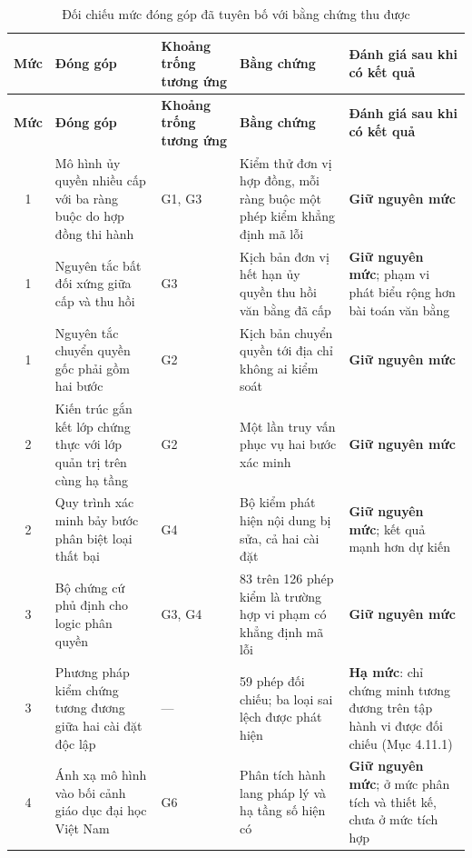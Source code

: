 \begin{longtable}{|c|p{4.0cm}|p{2.4cm}|p{2.5cm}|p{3.0cm}|}
\caption{Đối chiếu mức đóng góp đã tuyên bố với bằng chứng thu được}
\label{tab:contribution-levels} \\

\hline
\textbf{Mức} & \textbf{Đóng góp} & \textbf{Khoảng trống tương ứng} & \textbf{Bằng chứng} & \textbf{Đánh giá sau khi có kết quả} \\
\hline
\endfirsthead

\hline
\textbf{Mức} & \textbf{Đóng góp} & \textbf{Khoảng trống tương ứng} & \textbf{Bằng chứng} & \textbf{Đánh giá sau khi có kết quả} \\
\hline
\endhead

\hline
\endfoot

\hline
\endlastfoot

1 & Mô hình ủy quyền nhiều cấp với ba ràng buộc do hợp đồng thi hành
& G1, G3
& Kiểm thử đơn vị hợp đồng, mỗi ràng buộc một phép kiểm khẳng định mã lỗi
& \textbf{Giữ nguyên mức}
\\ \hline

1 & Nguyên tắc bất đối xứng giữa cấp và thu hồi
& G3
& Kịch bản đơn vị hết hạn ủy quyền thu hồi văn bằng đã cấp
& \textbf{Giữ nguyên mức}; phạm vi phát biểu rộng hơn bài toán văn bằng
\\ \hline

1 & Nguyên tắc chuyển quyền gốc phải gồm hai bước
& G2
& Kịch bản chuyển quyền tới địa chỉ không ai kiểm soát
& \textbf{Giữ nguyên mức}
\\ \hline

2 & Kiến trúc gắn kết lớp chứng thực với lớp quản trị trên cùng hạ tầng
& G2
& Một lần truy vấn phục vụ hai bước xác minh
& \textbf{Giữ nguyên mức}
\\ \hline

2 & Quy trình xác minh bảy bước phân biệt loại thất bại
& G4
& Bộ kiểm phát hiện nội dung bị sửa, cả hai cài đặt
& \textbf{Giữ nguyên mức}; kết quả mạnh hơn dự kiến
\\ \hline

3 & Bộ chứng cứ phủ định cho logic phân quyền
& G3, G4
& 83 trên 126 phép kiểm là trường hợp vi phạm có khẳng định mã lỗi
& \textbf{Giữ nguyên mức}
\\ \hline

3 & Phương pháp kiểm chứng tương đương giữa hai cài đặt độc lập
& ---
& 59 phép đối chiếu; ba loại sai lệch được phát hiện
& \textbf{Hạ mức}: chỉ chứng minh tương đương trên tập hành vi được đối chiếu (Mục 4.11.1)
\\ \hline

4 & Ánh xạ mô hình vào bối cảnh giáo dục đại học Việt Nam
& G6
& Phân tích hành lang pháp lý và hạ tầng số hiện có
& \textbf{Giữ nguyên mức}; ở mức phân tích và thiết kế, chưa ở mức tích hợp
\\ \hline

\end{longtable}
